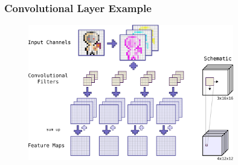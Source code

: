 \begin{frame}
  \frametitle{Convolutional Layer Example}
  \vspace{0.2cm}
  \begin{figure} \includegraphics[width=0.8\textwidth]{../4_nn/figs/nn_theory_cnn_basics.pdf} \end{figure}
\end{frame}

